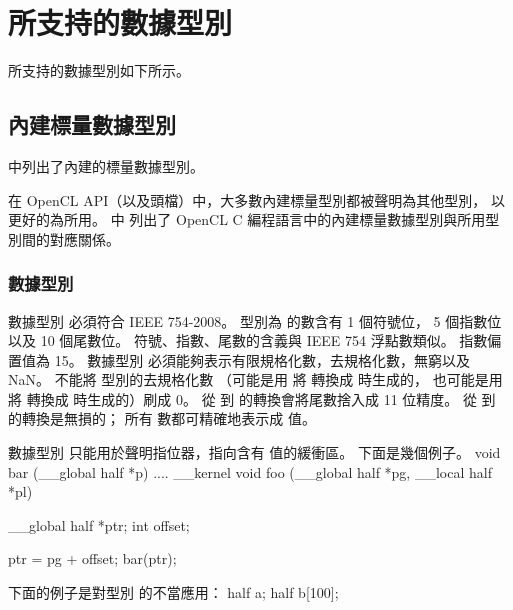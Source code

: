 \section{所支持的數據型別}

所支持的數據型別如下所示。

\subsection[section:bisdt]{內建標量數據型別}

中列出了內建的標量數據型別。

{}

在 OpenCL API（以及頭檔）中，大多數內建標量型別都被聲明為其他型別，
以更好的為所用。
中
列出了 OpenCL C 編程語言中的內建標量數據型別與所用型別間的對應關係。

{}

\subsubsection[section:dataTypeHalf]{數據型別 }

數據型別  必須符合 IEEE 754-2008。
型別為  的數含有 1 個符號位， 5 個指數位以及 10 個尾數位。
符號、指數、尾數的含義與 IEEE 754 浮點數類似。
指數偏置值為 15。
數據型別  必須能夠表示有限規格化數，去規格化數，無窮以及 NaN。
不能將  型別的去規格化數
（可能是用  將  轉換成  時生成的，
也可能是用  將  轉換成  時生成的）刷成 0。
從  到  的轉換會將尾數捨入成 11 位精度。
從   到  的轉換是無損的；
所有  數都可精確地表示成  值。

數據型別  只能用於聲明指位器，指向含有  值的緩衝區。
下面是幾個例子。
\startclc
void bar (__global half *p)
{
	....
}
__kernel void foo (__global half *pg, __local half *pl)
{
	__global half *ptr;
	int offset;

	ptr = pg + offset;
	bar(ptr);
}
\stopclc

下面的例子是對型別  的不當應用：
\startclc
half a;
half b[100];

